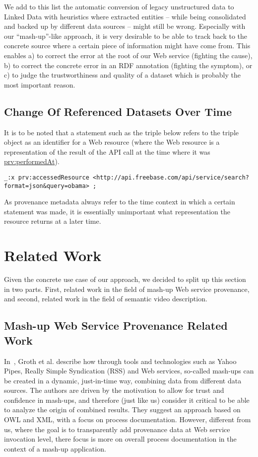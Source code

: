 \documentclass[conference]{IEEEtran}
\begin{document}
We add to this list the automatic conversion of legacy unstructured data to Linked Data with heuristics where extracted
entities -- while being consolidated and backed up by different data sources -- might still be wrong. Especially with our
``mash-up''-like approach, it is very desirable to be able to track back to the concrete source where a certain piece
of information might have come from. This enables a) to correct the error at the root of our Web service (fighting the
cause), b) to correct the concrete error in an RDF annotation (fighting the symptom), or c) to judge the
trustworthiness and quality of a dataset which is probably the most important reason.

\subsection{Change Of Referenced Datasets Over Time}                        \label{sec:change}
It is to be noted that a statement such as the triple below refers to the triple object as an identifier for a Web
resource (where the Web resource is a representation of the result of the API call at the time where it was
\url{prv:performedAt}).
\begin{lstlisting}
_:x prv:accessedResource <http://api.freebase.com/api/service/search?format=json&query=obama> ;
\end{lstlisting}
As provenance metadata always refer to the time context in which a certain statement was made, it is essentially
unimportant what representation the resource returns at a later time.


\section{Related Work}\label{sec:related}
Given the concrete use case of our approach, we decided to split up this section in two parts. First, related work in the field of mash-up Web service provenance, and second, related work in the field of semantic video description.

\subsection{Mash-up Web Service Provenance Related Work}
In~\cite{Groth:2009:MPD:1462159.1462162}, Groth et al. describe how through tools and technologies such as Yahoo Pipes, Really Simple Syndication (RSS) and Web services, so-called mash-ups can be created in a dynamic, just-in-time way, combining data from different data sources. The authors are driven by the motivation to allow for trust and confidence in mash-ups, and therefore (just like us) consider it critical to be able to analyze the origin of combined results. They suggest an approach based on OWL and XML, with a focus on process documentation. However, different from us, where the goal is to transparently add provenance data at Web service invocation level, there focus is more on overall process documentation in the context of a mash-up application.
\end{document}
